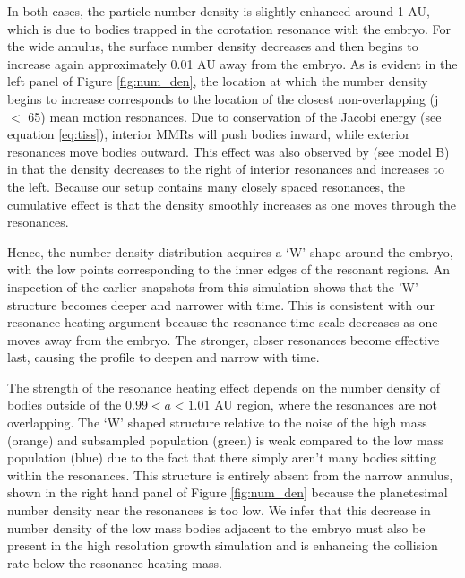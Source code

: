 In both cases, the particle number density is slightly enhanced around 1 AU, which is due to bodies trapped in the corotation 
resonance with the embryo. For the wide annulus, the surface number density decreases and then begins to increase again 
approximately 0.01 AU away from the embryo. As is evident in the left panel of Figure \ref{fig:num_den}, the location at which the 
number density begins to increase corresponds to the location of the closest non-overlapping (j $<$ 65) mean motion 
resonances. Due to conservation of the Jacobi energy (see equation \ref{eq:tiss}), interior MMRs will push bodies inward, while 
exterior resonances move bodies outward. This effect was also observed by \cite{richardson00} (see model B) in that the 
density decreases to the right of interior resonances and increases to the left. Because our setup contains many closely spaced 
resonances, the cumulative effect is that the density smoothly increases as one moves through the resonances. 

Hence, the number density distribution acquires a `W' shape around the embryo, with the low points corresponding to the inner 
edges of the resonant regions. An inspection of the earlier snapshots from this simulation shows that the 'W' structure becomes 
deeper and narrower with time. This is consistent with our resonance heating argument because the resonance time-scale 
decreases as one moves away from the embryo. The stronger, closer resonances become effective last, causing the profile to 
deepen and narrow with time.

The strength of the resonance heating effect depends on the number density of bodies outside of the $0.99 < a < 1.01$ AU 
region, where the resonances are not overlapping. The `W' shaped structure relative to the noise of the high mass (orange) and 
subsampled population (green) is weak compared to the low mass population (blue) due to the fact that there simply aren't many 
bodies sitting within the resonances. This structure is entirely absent from the narrow annulus, shown in the right hand panel of 
Figure \ref{fig:num_den} because the planetesimal number density near the resonances is too low. We infer that this decrease in 
number density of the low mass bodies adjacent to the embryo must also be present in the high resolution growth simulation and 
is enhancing the collision rate below the resonance heating mass.

